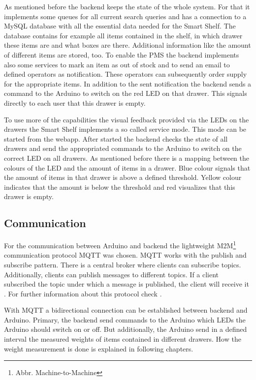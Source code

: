 As mentioned before the backend keeps the state of the whole system. 
For that it implements some queues for all current search queries and has a connection to a MySQL database with all the essential data needed for the Smart Shelf. 
The database contains for example all items contained in the shelf, in which drawer these items are and what boxes are there. 
Additional information like the amount of different items are stored, too. 
To enable the PMS the backend implements also some services to mark an item as out of stock and to send an email to defined operators as notification. 
These operators can subsequently order supply for the appropriate items. 
In addition to the sent notification the backend sends a command to the Arduino to switch on the red LED on that drawer. 
This signals directly to each user that this drawer is empty. 

To use more of the capabilities the visual feedback provided via the LEDs on the drawers the Smart Shelf implements a so called service mode. 
This mode can be started from the webapp. 
After started the backend checks the state of all drawers and send the appropriated commands to the Arduino to switch on the correct LED on all drawers. 
As mentioned before there is a mapping between the colours of the LED and the amount of items in a drawer. 
Blue colour signals that the amount of items in that drawer is above a defined threshold. 
Yellow colour indicates that the amount is below the threshold and red visualizes that this drawer is empty. 

\subsection{Communication}\label{sec:communciation}
For the communication between Arduino and backend the lightweight M2M\footnote{Abbr. Machine-to-Machine} communication protocol MQTT was chosen. 
MQTT works with the publish and subscribe pattern. 
There is a central broker where clients can subscribe topics. 
Additionally, clients can publish messages to different topics. 
If a client subscribed the topic under which a message is published, the client will receive it \cite{standard2014mqtt}. 
For further information about this protocol check \cite{standard2014mqtt}. 

With MQTT a bidirectional connection can be established between backend and Arduino. 
Primary, the backend send commands to the Arduino which LEDs the Arduino should switch on or off. 
But additionally, the Arduino send in a defined interval the measured weights of items contained in different drawers. 
How the weight measurement is done is explained in following chapters. 

